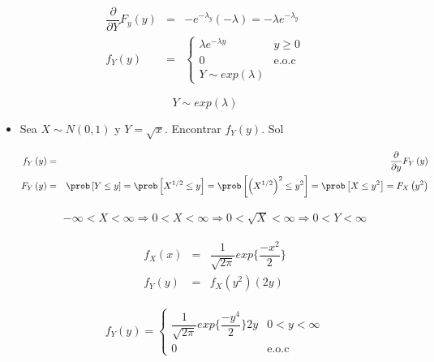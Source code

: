 \begin{Ejem}
\begin{itemize}
\begin{eqnarray*}
\dfrac{\partial}{\partial Y} F_{y} \left( y \right) &=& -e^{-\lambda_{y}} \left(-\lambda \right) = -\lambda e^{-\lambda_{y}}\\
f_{Y}\left(y \right) &=& \left\{
\begin{array}{cc} 
\lambda e^{-\lambda y} &y \geq 0 \\
 0 &  \textrm{e.o.c}\\
 Y \sim exp \left( \lambda \right)
\end{array}
\right.
\end{eqnarray*} 
 
\smallskip

$$Y \sim exp \left( \lambda \right)$$
\end{itemize}
\end{Ejem}

 
  
\begin{Ejem}
\begin{itemize}
\item Sea $X \sim N\left(0,1 \right)$ y $Y= \sqrt{x}$. Encontrar $f_{Y}\left(y\right)$.
{Sol}
 
\bigskip
\begin{eqnarray*}
f_{Y}\left(y\right)&=&\dfrac{\partial}{\partial y}F_{Y}\left(y\right)\\
F_{Y}\left(y\right) &=&\prob \left[ Y \leq y\right] = \prob \left[ X^{1/2}\leq y\right]= \prob \left[ \left( X^{1/2} \right)^{2} \leq y^{2} \right] = \prob \left[ X \leq y^{2} \right] = F_{X}\left(y^{2} \right) 
\end{eqnarray*}

\begin{eqnarray*}
-\infty < X < \infty \Rightarrow 0 < X < \infty \Rightarrow  0 < \sqrt{X} < \infty \Rightarrow 0 < Y < \infty
\end{eqnarray*}

\begin{eqnarray*}
f_{X}\left( x \right) &=& \dfrac{1}{\sqrt{2 \pi}} exp \bigg\{ \dfrac{-x^{2}}{2} \bigg\} \\
f_{Y}\left(y\right)&=& f_{X}\left(y^{2}\right)\left(2y\right)
\end{eqnarray*}

 \begin{eqnarray*}  
 f_{Y}\left(y\right)= \left\{
 \begin{array}{cc} 
 \dfrac{1}{\sqrt{2 \pi}} exp\bigg\{ \dfrac{-y^4}{2}\bigg\} 2y & 0<y< \infty \\ 
 0 & \textrm {e.o.c} 
 \end{array}
 \right.
 \end{eqnarray*}


\end{itemize}
\end{Ejem}


